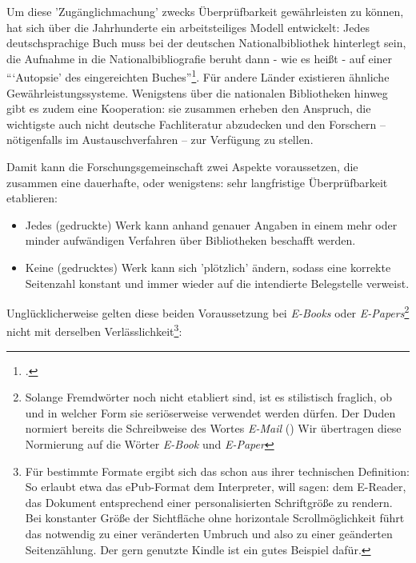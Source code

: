 Um diese 'Zugänglichmachung' zwecks Überprüfbarkeit gewährleisten zu können, hat
sich über die Jahrhunderte ein arbeitsteiliges Modell entwickelt: Jedes
deutschsprachige Buch muss bei der deutschen Nationalbibliothek hinterlegt sein,
die Aufnahme in die Nationalbibliografie beruht dann - wie es heißt - auf einer
\enquote{\enquote{Autopsie} des eingereichten
Buches}\footcite[vgl.][68]{Theisen2013a}. Für andere Länder existieren ähnliche
Gewährleistungssysteme. Wenigstens über die nationalen Bibliotheken hinweg gibt
es zudem eine Kooperation: sie zusammen erheben den Anspruch, die wichtigste
auch nicht deutsche Fachliteratur abzudecken und den Forschern -- nötigenfalls
im Austauschverfahren -- zur Verfügung zu stellen.

Damit kann die Forschungsgemeinschaft zwei Aspekte voraussetzen, die zusammen
eine dauerhafte, oder wenigstens: sehr langfristige Überprüfbarkeit etablieren:
\begin{itemize}
  \item Jedes (gedruckte) Werk kann anhand genauer Angaben in einem mehr oder
  minder aufwändigen Verfahren über Bibliotheken beschafft werden.
  \item  Keine (gedrucktes) Werk kann sich 'plötzlich' ändern, sodass eine
  korrekte Seitenzahl konstant und immer wieder auf die intendierte Belegstelle
  verweist.
\end{itemize}

Unglücklicherweise gelten diese beiden Voraussetzung bei \emph{E-Books} oder
\emph{E-Papers}\footnote{Solange Fremdwörter noch nicht etabliert sind, ist es
stilistisch fraglich, ob und in welcher Form sie seriöserweise verwendet werden
dürfen. Der Duden normiert bereits die Schreibweise des Wortes \emph{E-Mail}
(\cite[vgl.][392]{Duden2009a}) Wir übertragen diese Normierung auf die Wörter
\emph{E-Book} und \emph{E-Paper}} nicht mit derselben
Verlässlichkeit\footnote{Für bestimmte Formate ergibt sich das schon aus ihrer
technischen Definition: So erlaubt etwa das ePub-Format dem Interpreter, will
sagen: dem E-Reader, das Dokument entsprechend einer personalisierten
Schriftgröße zu rendern. Bei konstanter Größe der Sichtfläche ohne horizontale
Scrollmöglichkeit führt das notwendig zu einer veränderten Umbruch und also zu
einer geänderten Seitenzählung. Der gern genutzte Kindle ist ein gutes Beispiel
dafür.}:


